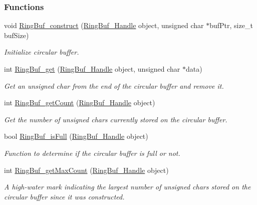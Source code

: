 \subsubsection*{Functions}
\begin{DoxyCompactItemize}
\item 
void \hyperlink{_ring_buf_8h_abadef81450098bc113f104e9adec83b1}{Ring\+Buf\+\_\+construct} (\hyperlink{_ring_buf_8h_ade97ef8496bcec2a38a8695128458883}{Ring\+Buf\+\_\+\+Handle} object, unsigned char $\ast$buf\+Ptr, size\+\_\+t buf\+Size)
\begin{DoxyCompactList}\small\item\em Initialize circular buffer. \end{DoxyCompactList}\item 
int \hyperlink{_ring_buf_8h_abb0526bc9c7e9a496e7a9fafc34e753e}{Ring\+Buf\+\_\+get} (\hyperlink{_ring_buf_8h_ade97ef8496bcec2a38a8695128458883}{Ring\+Buf\+\_\+\+Handle} object, unsigned char $\ast$data)
\begin{DoxyCompactList}\small\item\em Get an unsigned char from the end of the circular buffer and remove it. \end{DoxyCompactList}\item 
int \hyperlink{_ring_buf_8h_ac06c00bf7da6408bf2f17802e16c32a2}{Ring\+Buf\+\_\+get\+Count} (\hyperlink{_ring_buf_8h_ade97ef8496bcec2a38a8695128458883}{Ring\+Buf\+\_\+\+Handle} object)
\begin{DoxyCompactList}\small\item\em Get the number of unsigned chars currently stored on the circular buffer. \end{DoxyCompactList}\item 
bool \hyperlink{_ring_buf_8h_adfa531b7441b7fcb65b72adef7e830b9}{Ring\+Buf\+\_\+is\+Full} (\hyperlink{_ring_buf_8h_ade97ef8496bcec2a38a8695128458883}{Ring\+Buf\+\_\+\+Handle} object)
\begin{DoxyCompactList}\small\item\em Function to determine if the circular buffer is full or not. \end{DoxyCompactList}\item 
int \hyperlink{_ring_buf_8h_a0e764325ed5803e2dfa555b3e0a77e39}{Ring\+Buf\+\_\+get\+Max\+Count} (\hyperlink{_ring_buf_8h_ade97ef8496bcec2a38a8695128458883}{Ring\+Buf\+\_\+\+Handle} object)
\begin{DoxyCompactList}\small\item\em A high-\/water mark indicating the largest number of unsigned chars stored on the circular buffer since it was constructed. \end{DoxyCompactList}\item 

\end{DoxyCompactItemize}
